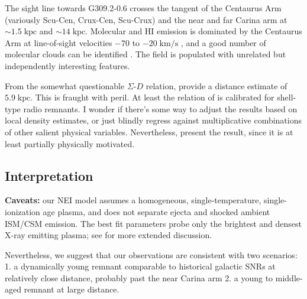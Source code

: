 \documentclass[preprint2,tighten,trackchanges]{aastex6}
\newcommand*{\mt}{\mathrm}
\newcommand*{\unit}[1]{\;\mt{#1}}  %
\newcommand*{\abt}{\mathord{\sim}} %
\begin{document}
The sight line towards G309.2-0.6 crosses the tangent of the Centaurus Arm
(variously Scu-Cen, Crux-Cen, Scu-Crux) and the near and far Carina arm at
$\abt 1.5 \unit{kpc}$ and $\abt 14 \unit{kpc}$.  Molecular and HI emission is
dominated by the Centaurus Arm at line-of-sight velocities $-70$ to
$-20 \unit{km/s}$ \citep[e.g.,][Figure 4]{dame2011}, and a good number of
molecular clouds can be identified \citep{rice2016}.  The field is populated
with unrelated but independently interesting features.

From the somewhat questionable $\Sigma$-$D$ relation, \citet{pavlovic2014}
provide a distance estimate of $5.9 \unit{kpc}$.
This is fraught with peril.
At least the relation of \citet{pavlovic2014} is calibrated for shell-type
radio remnants.
I wonder if there's some way to adjust the results based on local density
estimates, or just blindly regress against multiplicative combinations of other
salient physical variables.
Nevertheless, present the result, since it is at least partially physically
motivated.

\subsection{Interpretation}

\textbf{Caveats:} our NEI model assumes a homogeneous, single-temperature,
single-ionization age plasma, and does not separate ejecta and shocked ambient
ISM/CSM emission.
The best fit parameters probe only the brightest and densest X-ray emitting
plasma; see \citet{rakowski2006-g337} for more extended discussion.

Nevertheless, we suggest that our observations are consistent with two
scenarios:
1. a dynamically young remnant comparable to historical galactic SNRs at
relatively close distance, probably past the near Carina arm
2. a young to middle-aged remnant at large distance.
\end{document}
